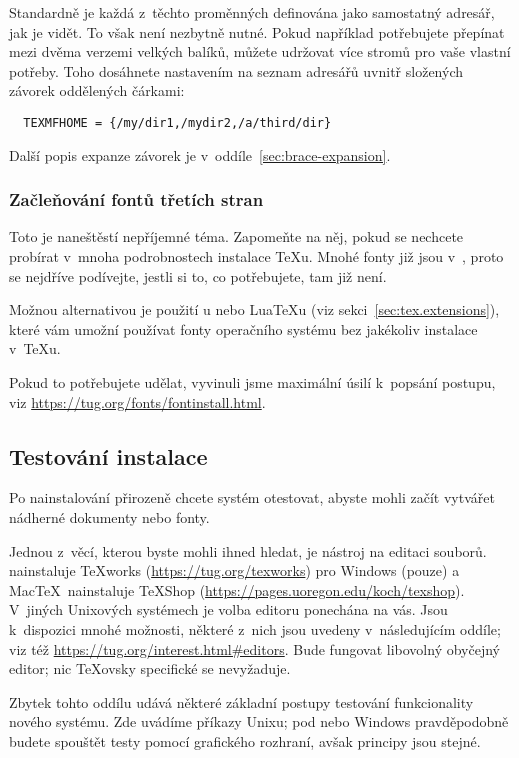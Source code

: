\documentclass[\classoptions,slovak,english,czech]{\classname}
\begin{document}
Standardně je každá z~těchto proměnných definována jako 
samostatný adresář, jak je vidět. To však není nezbytně nutné. 
Pokud například potřebujete přepínat mezi dvěma verzemi velkých
balíků, můžete udržovat více stromů pro vaše vlastní potřeby.  
Toho dosáhnete nastavením  na seznam adresářů uvnitř 
složených závorek oddělených čárkami:

\begin{verbatim}
  TEXMFHOME = {/my/dir1,/mydir2,/a/third/dir}
\end{verbatim}

Další popis expanze závorek je v~oddíle~\ref{sec:brace-expansion}.

\subsubsection{Začleňování fontů třetích stran}
Toto je naneštěstí nepříjemné téma. Zapomeňte na něj, 
pokud se nechcete probírat v~mnoha 
podrobnostech instalace \TeX u. Mnohé fonty již jsou v~\TL, proto
se nejdříve podívejte, jestli si to, co potřebujete, tam již není.

Možnou alternativou je použití \XeTeX{}u nebo Lua\TeX{}u 
(viz sekci~\ref{sec:tex.extensions}), které vám
umožní používat fonty operačního systému bez jakékoliv instalace v~\TeX{}u.

Pokud to potřebujete udělat, vyvinuli jsme maximální úsilí 
k~popsání postupu, viz \url{https://tug.org/fonts/fontinstall.html}.


\subsection{Testování instalace}
\label{sec:test.install}

Po nainstalování \TL{} přirozeně chcete
systém otestovat, abyste mohli začít vytvářet nádherné dokumenty nebo fonty.

Jednou z~věcí, kterou byste mohli ihned hledat, je nástroj na editaci
souborů.  \TL{} nainstaluje \TeX{}works (\url{https://tug.org/texworks})
pro Windows (pouze) a Mac\TeX\ nainstaluje TeXShop
(\url{https://pages.uoregon.edu/koch/texshop}).  V~jiných Unixových systémech
je volba editoru ponechána na vás. Jsou k~dispozici mnohé možnosti, 
některé z~nich jsou uvedeny v~následujícím oddíle; viz
též \url{https://tug.org/interest.html#editors}. Bude fungovat libovolný
obyčejný editor; nic \TeX{}ovsky specifické se nevyžaduje.

Zbytek tohto oddílu udává některé základní postupy testování funkcionality
nového systému. Zde uvádíme příkazy Unixu; pod
\MacOSX{} nebo Windows pravděpodobně budete spouštět testy pomocí
grafického rozhraní, avšak principy jsou stejné.
\end{document}
